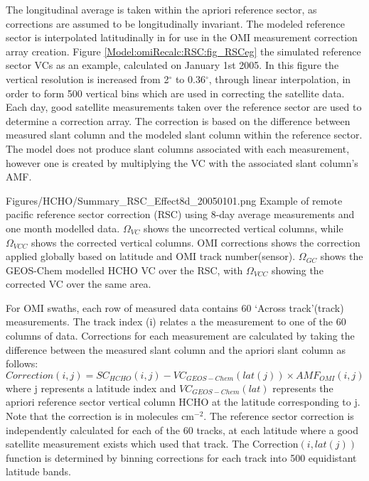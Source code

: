     The longitudinal average is taken within the apriori reference sector, as corrections are assumed to be longitudinally invariant.
    The modeled reference sector is interpolated latitudinally in for use in the OMI measurement correction array creation.
    Figure \ref{Model:omiRecalc:RSC:fig_RSCeg} the simulated reference sector VCs as an example, calculated on January 1st 2005.
    In this figure the vertical resolution is increased from 2$^{\circ}$ to 0.36$^{\circ}$, through linear interpolation, in order to form 500 vertical bins which are used in correcting the satellite data.
    Each day, good satellite measurements taken over the reference sector are used to determine a correction array.
    The correction is based on the difference between measured slant column and the modeled slant column within the reference sector.
    The model does not produce slant columns associated with each measurement, however one is created by multiplying the VC with the associated slant column's AMF.
    
    {Figures/HCHO/Summary_RSC_Effect8d_20050101.png}
    {%
      Example of remote pacific reference sector correction (RSC) using 8-day average measurements and one month modelled data.
      $\Omega_{VC}$ shows the uncorrected vertical columns, while $\Omega_{VCC}$ shows the corrected vertical columns.
      OMI corrections shows the correction applied globally based on latitude and OMI track number(sensor).
      $\Omega_{GC}$ shows the GEOS-Chem modelled HCHO VC over the RSC, with $\Omega_{VCC}$ showing the corrected VC over the same area.
    }
    {\label{Model:omiRecalc:RSC:fig_RSCeg}}
    
    For OMI swaths, each row of measured data contains 60 `Across track'(track) measurements.
    The track index (i) relates a the measurement to one of the 60 columns of data.
    Corrections for each measurement are calculated by taking the difference between the measured slant column and the apriori slant column as follows:
    \begin{equation} \label{Model:omiRecalc:eqn_RSC}
      Correction(i,j) = SC_{HCHO}(i,j) - VC_{GEOS-Chem}(lat(j)) \times {AMF_{OMI}}(i,j)
    \end{equation}
    where j represents a latitude index and $VC_{GEOS-Chem}(lat)$ represents the apriori reference sector vertical column HCHO at the latitude corresponding to j.
    Note that the correction is in molecules cm$^{-2}$.
    The reference sector correction is independently calculated for each of the 60 tracks, at each latitude where a good satellite measurement exists which used that track.
    The Correction$(i,lat(j))$ function is determined by binning corrections for each track into 500 equidistant latitude bands. 
    
